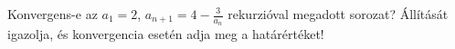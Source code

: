 \documentclass[11pt]{scrartcl}
\begin{document}
Konvergens-e az $a_1 = 2$, \(a_{n + 1} = 4 - \frac{3}{a_n}\) rekurzióval
megadott sorozat? Állítását igazolja, és konvergencia esetén adja meg a
határértéket!
\end{document}
